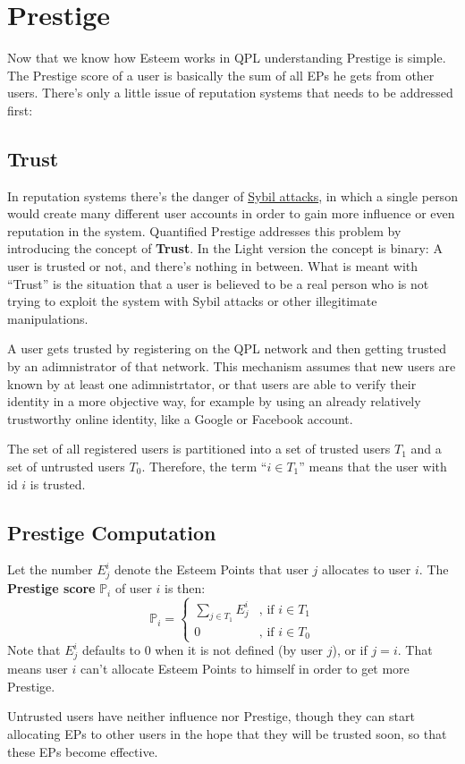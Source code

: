 \documentclass[a4paper,12pt]{scrartcl}
\newcounter{formula}
\newcounter{example}
\newcounter{comment}
\begin{document}
\section{Prestige}
Now that we know how Esteem works in QPL understanding Prestige is simple. The Prestige score of a user is basically the sum of all EPs he gets from other users. There's only a little issue of reputation systems that needs to be addressed first:

\subsection{Trust}
In reputation systems there's the danger of \href{http://en.wikipedia.org/wiki/Sybil_attack}{Sybil attacks}, in which a single person would create many different user accounts in order to gain more influence or even reputation in the system. Quantified Prestige addresses this problem by introducing the concept of \textbf{Trust}. In the Light version the concept is binary: A user is trusted or not, and there's nothing in between. What is meant with ``Trust'' is the situation that a user is believed to be a real person who is not trying to exploit the system with Sybil attacks or other illegitimate manipulations.

A user gets trusted by registering on the QPL network and then getting trusted by an adimnistrator of that network. This mechanism assumes that new users are known by at least one adimnistrtator, or that users are able to verify their identity in a more objective way, for example by using an already relatively trustworthy online identity, like a Google or Facebook account.

The set of all registered users is partitioned into a set of trusted users $T_1$ and a set of untrusted users $T_0$. Therefore, the term ``$i \in T_1$'' means that the user with id $i$ is trusted.

\subsection{Prestige Computation}

\begin{mdframed}[style=formula, comment=QPL Prestige Formula]
Let the number $E_j^i$ denote the Esteem Points that user $j$ allocates to user $i$. The \textbf{Prestige score} $\mathbb{P}_i$ of user $i$ is then:
$$\mathbb{P}_i = \left\{ 
\begin{array}{ll}
\sum_{j \in T_1} E_j^i & \mbox{, if } i \in T_1 \\
0 & \mbox{, if } i \in T_0
\end{array}
\right.$$
Note that $E_j^i$ defaults to $0$ when it is not defined (by user $j$), or if $j=i$. That means user $i$ can't allocate Esteem Points to himself in order to get more Prestige.
\end{mdframed}
Untrusted users have neither influence nor Prestige, though they can start allocating EPs to other users in the hope that they will be trusted soon, so that these EPs become effective.
\end{document}
